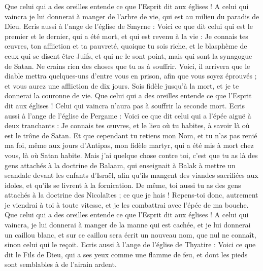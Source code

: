 \begin{multicols}{2}
Que celui qui a des oreilles entende ce que l'Esprit dit aux églises ! A celui qui vaincra je lui donnerai à manger de l'arbre de vie, qui est au milieu du paradis de Dieu.
Ecris aussi à l'ange de l'église de Smyrne : Voici ce que dit celui qui est le premier et le dernier, qui a été mort, et qui est revenu à la vie :
Je connais tes œuvres, ton affliction et ta pauvreté, quoique tu sois riche, et le blasphème de ceux qui se disent être Juifs, et qui ne le sont point, mais qui sont la synagogue de Satan.
Ne crains rien des choses que tu as à souffrir. Voici, il arrivera que le diable mettra quelques-uns d'entre vous en prison, afin que vous soyez éprouvés ; et vous aurez une affliction de dix jours. Sois fidèle jusqu'à la mort, et je te donnerai la couronne de vie.
Que celui qui a des oreilles entende ce que l'Esprit dit aux églises ! Celui qui vaincra n'aura pas à souffrir la seconde mort.
Ecris aussi à l'ange de l'église de Pergame : Voici ce que dit celui qui a l'épée aiguë à deux tranchants : 
Je connais tes œuvres, et le lieu où tu habites, à savoir là où est le trône de Satan. Et que cependant tu retiens mon Nom, et tu n'as pas renié ma foi, même aux jours d'Antipas, mon fidèle martyr, qui a été mis à mort chez vous, là où Satan habite.
Mais j'ai quelque chose contre toi, c'est que tu as là des gens attachés à la doctrine de Balaam, qui enseignait à Balak à mettre un scandale devant les enfants d'Israël, afin qu'ils mangent des viandes sacrifiées aux idoles, et qu'ils se livrent à la fornication.
De même, toi aussi tu as des gens attachés à la doctrine des Nicolaïtes ; ce que je hais !
Repens-toi donc, autrement je viendrai à toi à toute vitesse, et je les combattrai avec l'épée de ma bouche.
Que celui qui a des oreilles entende ce que l'Esprit dit aux églises ! A celui qui vaincra, je lui donnerai à manger de la manne qui est cachée, et je lui donnerai un caillou blanc, et sur ce caillou sera écrit un nouveau nom, que nul ne connaît, sinon celui qui le reçoit.
Ecris aussi à l'ange de l'église de Thyatire : Voici ce que dit le Fils de Dieu, qui a ses yeux comme une flamme de feu, et dont les pieds sont semblables à de l'airain ardent.

\end{multicols}
